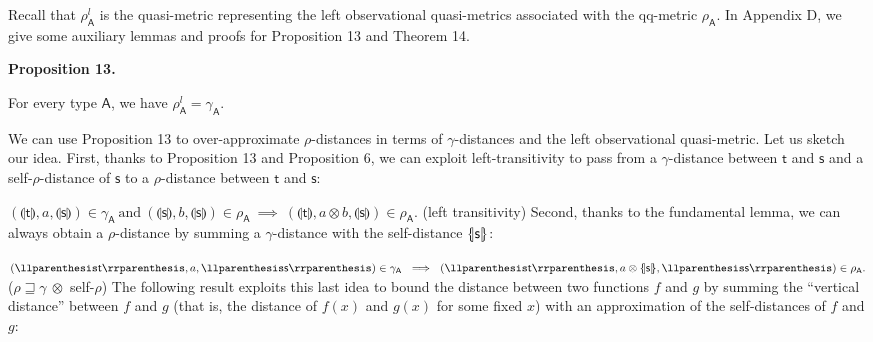  
 
Recall that $\rho_{\mathsf{A}}^{l}$ is the quasi-metric representing the left observational quasi-metrics associated with the qq-metric $\rho_{\mathsf{A}}$. In Appendix D, we give some auxiliary lemmas and proofs for Proposition 13 and Theorem 14.\par
 
 
 
\par\medskip\noindent\textbf{Proposition 13.}\par
 
 
For every type $\mathsf{A}$, we have $\rho^{l}_{{\mathsf{A}}}=\gamma_{\mathsf{A}}$.\par
 
 
 
 
We can use Proposition 13 to over-approximate $\rho$-distances in terms of $\gamma$-distances and the left observational quasi-metric. Let us sketch our idea. First, thanks to Proposition 13 and Proposition 6, we can exploit left-transitivity to pass from a $\gamma$-distance between $\mathsf{t}$ and $\mathsf{s}$ and a self-$\rho$-distance of $\mathsf{s}$ to a $\rho$-distance between $\mathsf{t}$ and $\mathsf{s}$:\par
    $\displaystyle(\llparenthesis\mathsf{t}\rrparenthesis,a,\llparenthesis\mathsf{s%
}\rrparenthesis)\in\gamma_{\mathsf{A}}\ \text{and}\ (\llparenthesis\mathsf{s}%
\rrparenthesis,b,\llparenthesis\mathsf{s}\rrparenthesis)\in\rho_{{\mathsf{A}}}%
\ \implies\ (\llparenthesis\mathsf{t}\rrparenthesis,a\otimes b,\llparenthesis%
\mathsf{s}\rrparenthesis)\in\rho_{{\mathsf{A}}}.$  (left transitivity)   
Second, thanks to the fundamental lemma, we can always obtain a $\rho$-distance by summing a $\gamma$-distance with the self-distance $\{\hskip-2.25pt|\mathsf{s}|\hskip-2.25pt\}$:\par
    $\displaystyle(\llparenthesis\mathsf{t}\rrparenthesis,a,\llparenthesis\mathsf{s%
}\rrparenthesis)\in\gamma_{\mathsf{A}}\ \implies\ (\llparenthesis\mathsf{t}%
\rrparenthesis,a\otimes\{\hskip-2.25pt|\mathsf{s}|\hskip-2.25pt\},%
\llparenthesis\mathsf{s}\rrparenthesis)\in\rho_{{\mathsf{A}}}.$  ($\rho\sqsupseteq\gamma\ \otimes$ self-$\rho$)   
The following result exploits this last idea to bound the distance between two functions $f$ and $g$ by summing the “vertical distance” between $f$ and $g$ (that is, the distance of $f(x)$ and $g(x)$ for some fixed $x$) with an approximation of the self-distances of $f$ and $g$:\par
 
